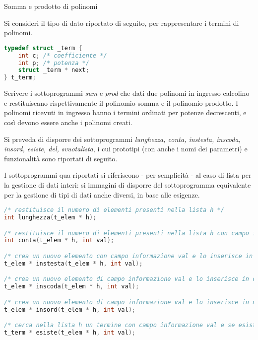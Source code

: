 \begin{exrev}{Somma e prodotto di polinomi}

Si consideri il tipo di dato riportato di seguito, per rappresentare i termini di polinomi.

\begin{lstlisting}[language=c]
typedef struct _term {
    int c; /* coefficiente */
    int p; /* potenza */
    struct _term * next;
} t_term;
\end{lstlisting}

Scrivere i sottoprogrammi \textit{sum} e \textit{prod} che dati due polinomi in ingresso calcolino e restituiscano rispettivamente il polinomio somma e il polinomio prodotto. I polinomi ricevuti in ingresso hanno i termini ordinati per potenze decrescenti, e cos\`i devono essere anche i polinomi creati.

Si preveda di disporre dei sottoprogrammi \textit{lunghezza, conta, instesta, inscoda, insord, esiste, del, svuotalista}, i cui prototipi (con anche i nomi dei parametri) e funzionalit\`a sono riportati di seguito. 

I sottoprogrammi qua riportati si riferiscono - per semplicit\`a - al caso di lista per la gestione di dati interi: si immagini di disporre del sottoprogramma equivalente per la gestione di tipi di dati anche diversi, in base alle esigenze.

\begin{lstlisting}[language=c]
/* restituisce il numero di elementi presenti nella lista h */
int lunghezza(t_elem * h);

/* restituisce il numero di elementi presenti nella lista h con campo informazione val */
int conta(t_elem * h, int val);

/* crea un nuovo elemento con campo informazione val e lo inserisce in testa alla lista h, restituendo la testa */
t_elem * instesta(t_elem * h, int val);

/* crea un nuovo elemento di campo informazione val e lo inserisce in coda alla lista h, restituendo la testa */
t_elem * inscoda(t_elem * h, int val);

/* crea un nuovo elemento di campo informazione val e lo inserisce in nella lista h in ordine rispetto al campo intero, restituendo la testa */
t_elem * insord(t_elem * h, int val);

/* cerca nella lista h un termine con campo informazione val e se esiste restituisce il puntatore a tale termine altrimenti restituisce NULL */
t_term * esiste(t_elem * h, int val);


\end{lstlisting}
\end{exrev}
